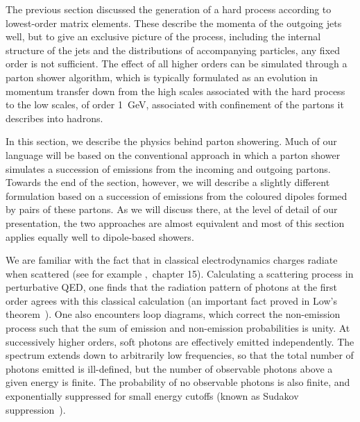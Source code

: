 The previous section discussed the generation of a hard process
according to lowest-order matrix elements.  These describe the momenta of
the outgoing jets well, but to give an exclusive picture of the process,
including the internal structure of the jets and the distributions of
accompanying particles, any fixed order is not sufficient.  The effect
of all higher orders can be simulated through a parton shower algorithm,
which is typically formulated as an evolution in momentum transfer down
from the high scales associated with the hard process to the low scales,
of order 1~GeV, associated with confinement of the partons it describes
into hadrons.

In this section, we describe the physics behind parton showering.  Much
of our language will be based on the conventional approach in which a
parton shower simulates a succession of emissions from the incoming and
outgoing partons.  Towards the end of the section, however, we will
describe a slightly different formulation based on a succession of
emissions from the coloured dipoles formed by pairs of these
partons.  As we will discuss there, at the level of detail of our
presentation, the two approaches are almost equivalent and most of this
section applies equally well to dipole-based showers.


We are familiar with the fact that in classical electrodynamics charges
radiate when scattered (see for example \cite{jackson1999},~chapter 15).
Calculating a scattering process in perturbative QED, one finds that the
radiation pattern of photons at the first order agrees with this
classical calculation (an important fact proved in Low's
theorem~\cite{Low:1958sn}).  One also encounters loop diagrams, which
correct the non-emission process such that the sum of emission and
non-emission probabilities is unity.  At successively higher
orders, soft photons are effectively emitted independently.
The spectrum extends down to arbitrarily low
frequencies, so that the total number of photons emitted is ill-defined,
but the number of observable
photons above a given energy is finite.  The probability of no
observable photons is also finite, and exponentially suppressed for
small energy cutoffs (known as Sudakov suppression~\cite{Sudakov:1954sw}).

